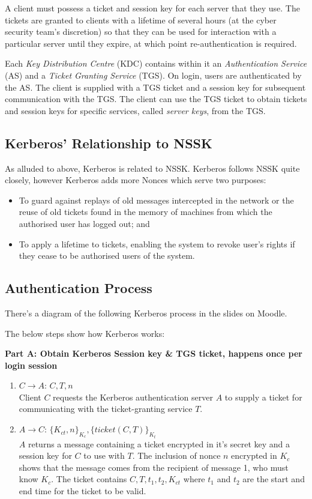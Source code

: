 A client must possess a ticket and session key for each server that they use. The tickets are granted to clients with a lifetime of several hours (at the cyber security team's discretion) so that they can be used for interaction with a particular server until they expire, at which point re-authentication is required. 

Each \textit{Key Distribution Centre} (KDC) contains within it an \textit{Authentication Service} (AS) and a \textit{Ticket Granting Service} (TGS). On login, users are authenticated by the AS. The client is supplied with a TGS ticket and a session key for subsequent communication with the TGS. The client can use the TGS ticket to obtain tickets and session keys for specific services, called \textit{server keys}, from the TGS.

\subsection{Kerberos' Relationship to NSSK}
As alluded to above, Kerberos is related to NSSK. Kerberos follows NSSK quite closely, however Kerberos adds more Nonces which serve two purposes:
\begin{itemize}
    \item To guard against replays of old messages intercepted in the network or the reuse of old tickets found in the memory of machines from which the authorised user has logged out; and
    \item To apply a lifetime to tickets, enabling the system to revoke user's rights if they cease to be authorised users of the system.
\end{itemize}

\subsection{Authentication Process}
\begin{extlink}
There's a diagram of the following Kerberos process in the slides on Moodle.    
\end{extlink}

The below steps show how Kerberos works:

\textbf{Part A: Obtain Kerberos Session key \& TGS ticket, happens once per login session}
\begin{enumerate}
    \item $C \rightarrow A$: $C, T, n$\\
    Client $C$ requests the Kerberos authentication server $A$ to supply a ticket for communicating with the ticket-granting service $T$. 
    \item $A \rightarrow C$: $\{K_{ct}, n\}_{K_{c}}, \{ticket(C,T)\}_{K_{t}}$\\
    $A$ returns a message containing a ticket encrypted in it's secret key and a session key for $C$ to use with $T$. The inclusion of nonce $n$ encrypted in $K_c$ shows that the message comes from the recipient of message 1, who must know $K_c$. The ticket contains $C, T, t_1, t_2, K_{ct}$ where $t_1$ and $t_2$ are the start and end time for the ticket to be valid.
\end{enumerate}

